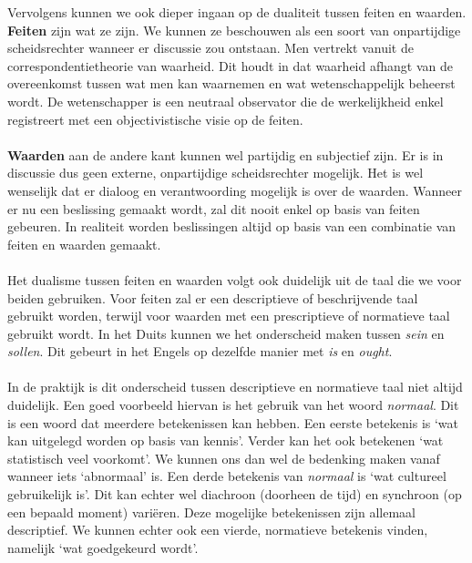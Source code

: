 \documentclass[../summary.tex]{subfiles}
\begin{document}
	Vervolgens kunnen we ook dieper ingaan op de dualiteit tussen feiten en waarden. \textbf{Feiten} zijn wat ze zijn. We kunnen ze beschouwen als een soort van onpartijdige scheidsrechter wanneer er discussie zou ontstaan. Men vertrekt vanuit de correspondentietheorie van waarheid. Dit houdt in dat waarheid afhangt van de overeenkomst tussen wat men kan waarnemen en wat wetenschappelijk beheerst wordt. De wetenschapper is een neutraal observator die de werkelijkheid enkel registreert met een objectivistische visie op de feiten.
	\\\\
	\textbf{Waarden} aan de andere kant kunnen wel partijdig en subjectief zijn. Er is in discussie dus geen externe, onpartijdige scheidsrechter mogelijk. Het is wel wenselijk dat er dialoog en verantwoording mogelijk is over de waarden. Wanneer er nu een beslissing gemaakt wordt, zal dit nooit enkel op basis van feiten gebeuren. In realiteit worden beslissingen altijd op basis van een combinatie van feiten en waarden gemaakt. 
	\\\\
	Het dualisme tussen feiten en waarden volgt ook duidelijk uit de taal die we voor beiden gebruiken. Voor feiten zal er een descriptieve of beschrijvende taal gebruikt worden, terwijl voor waarden met een prescriptieve of normatieve taal gebruikt wordt. In het Duits kunnen we het onderscheid maken tussen \textit{sein} en \textit{sollen}. Dit gebeurt in het Engels op dezelfde manier met \textit{is} en \textit{ought}. 
	\\\\
	In de praktijk is dit onderscheid tussen descriptieve en normatieve taal niet altijd duidelijk. Een goed voorbeeld hiervan is het gebruik van het woord \textit{normaal}. Dit is een woord dat meerdere betekenissen kan hebben. Een eerste betekenis is `wat kan uitgelegd worden op basis van kennis'. Verder kan het ook betekenen `wat statistisch veel voorkomt'. We kunnen ons dan wel de bedenking maken vanaf wanneer iets `abnormaal' is. Een derde betekenis van \textit{normaal} is `wat cultureel gebruikelijk is'. Dit kan echter wel diachroon (doorheen de tijd) en synchroon (op een bepaald moment) variëren. Deze mogelijke betekenissen zijn allemaal descriptief. We kunnen echter ook een vierde, normatieve betekenis vinden, namelijk `wat goedgekeurd wordt'.
	
	
\end{document}

